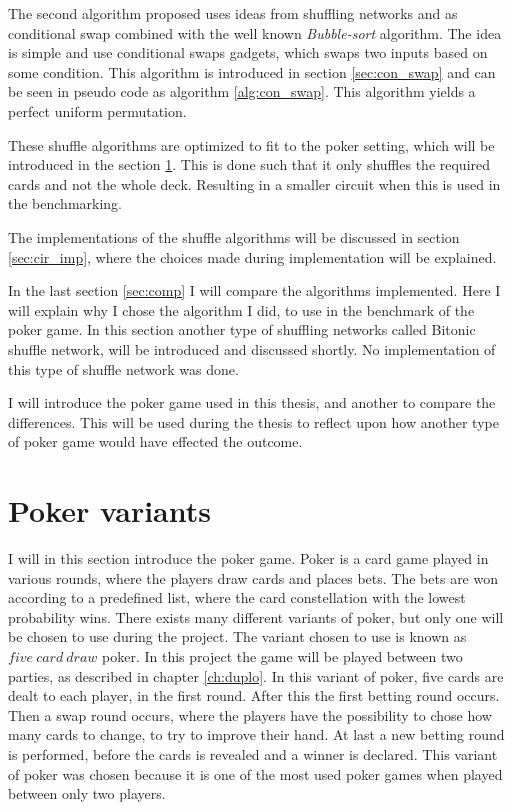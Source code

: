 \documentclass[twoside,11pt,openright]{report}
\begin{document}
The second algorithm proposed uses ideas from shuffling networks and \cite{psi} as conditional swap combined with the well known \textit{Bubble-sort} algorithm. The idea is simple and use conditional swaps gadgets, which swaps two inputs based on some condition. This algorithm is introduced in section \ref{sec:con_swap} and can be seen in pseudo code as algorithm \ref{alg:con_swap}. This algorithm yields a perfect uniform permutation.

These shuffle algorithms are optimized to fit to the poker setting, which will be introduced in the section \ref{sec:poker}. This is done such that it only shuffles the required cards and not the whole deck. Resulting in a smaller circuit when this is used in the benchmarking.

The implementations of the shuffle algorithms will be discussed in section \ref{sec:cir_imp}, where the choices made during implementation will be explained.

In the last section \ref{sec:comp} I will compare the algorithms implemented. Here I will explain why I chose the algorithm I did, to use in the benchmark of the poker game. In this section another type of shuffling networks called Bitonic shuffle network, will be introduced and discussed shortly. No implementation of this type of shuffle network was done.

\bigskip

I will introduce the poker game used in this thesis, and another to compare the differences. This will be used during the thesis to reflect upon how another type of poker game would have effected the outcome.

\section{Poker variants}
\label{sec:poker}
I will in this section introduce the poker game. Poker is a card game played in various rounds, where the players draw cards and places bets. The bets are won according to a predefined list, where the card constellation with the lowest probability wins. There exists many different variants of poker, but only one will be chosen to use during the project. The variant chosen to use is known as $five~card~draw$ poker. In this project the game will be played between two parties, as described in chapter \ref{ch:duplo}. In this variant of poker, five cards are dealt to each player, in the first round. After this the first betting round occurs. Then a swap round occurs, where the players have the possibility to chose how many cards to change, to try to improve their hand. At last a new betting round is performed, before the cards is revealed and a winner is declared. This variant of poker was chosen because it is one of the most used poker games when played between only two players.
\end{document}
